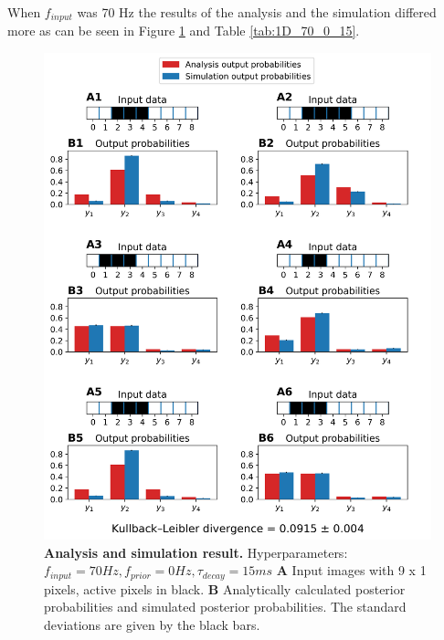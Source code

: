 When $f_{input}$ was 70 Hz the results of the analysis and the simulation differed more as can be seen in Figure \ref{fig:1D_70_0_15} and Table \ref{tab:1D_70_0_15}.

\begin{figure}
  \includegraphics[width=\linewidth]{figures/1D/1D_70_0_15.png}
    \caption{\textbf{Analysis and simulation result. } Hyperparameters: $f_{input} = 70 Hz, f_{prior} = 0 Hz, \tau_{decay} = 15 ms$ \textbf{A} Input images with 9 x 1 pixels, active pixels in black. \textbf{B} Analytically calculated posterior probabilities and simulated posterior probabilities. The standard deviations are given by the black bars.}
  \label{fig:1D_70_0_15}
\end{figure}

